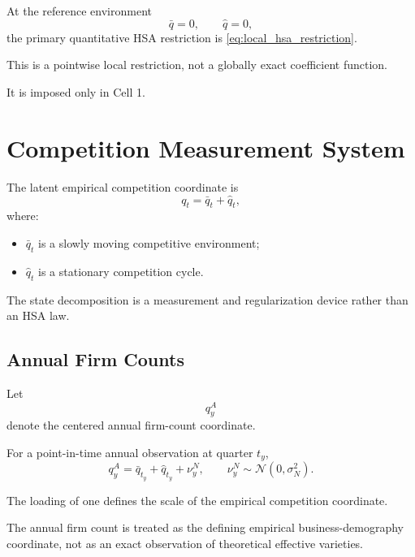 \documentclass[11pt]{article}
\newcommand{\Normal}{\mathcal{N}}
\begin{document}
At the reference environment
\begin{equation}
\bar q=0,
\qquad
\hat q=0,
\end{equation}
the primary quantitative HSA restriction is \cref{eq:local_hsa_restriction}.

This is a pointwise local restriction, not a globally exact coefficient function.

It is imposed only in Cell 1.

\section{Competition Measurement System}

The latent empirical competition coordinate is
\begin{equation}
q_t=\bar q_t+\hat q_t,
\label{eq:q_decomposition}
\end{equation}
where:
\begin{itemize}
\item \(\bar q_t\) is a slowly moving competitive environment;
\item \(\hat q_t\) is a stationary competition cycle.
\end{itemize}

The state decomposition is a measurement and regularization device rather than an HSA law.

\subsection{Annual Firm Counts}

Let
\begin{equation}
q_y^A
\end{equation}
denote the centered annual firm-count coordinate.

For a point-in-time annual observation at quarter \(t_y\),
\begin{equation}
q_y^A
=
\bar q_{t_y}
+
\hat q_{t_y}
+
\nu_y^N,
\qquad
\nu_y^N
\sim
\Normal(0,\sigma_N^2).
\label{eq:annual_measurement}
\end{equation}

The loading of one defines the scale of the empirical competition coordinate.

The annual firm count is treated as the defining empirical business-demography coordinate, not as an exact observation of theoretical effective varieties.
\end{document}
